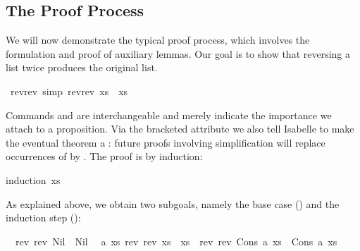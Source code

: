 \begin{isabellebody}
\begin{isamarkuptext}
\subsection{The Proof Process}

We will now demonstrate the typical proof process, which involves
the formulation and proof of auxiliary lemmas.
Our goal is to show that reversing a list twice produces the original
list.%
\end{isamarkuptext}%
\isamarkuptrue%
\isamarkupfalse%
\ rev{}rev\ {}simp{}{}\ {}rev{}rev\ xs{}\ {}\ xs{}%
\isadelimproof
%
\endisadelimproof
%
\isatagproof
%
\begin{isamarkuptxt}%
Commands  and  are
interchangeable and merely indicate the importance we attach to a
proposition. Via the bracketed attribute  we also tell Isabelle
to make the eventual theorem a : future proofs
involving simplification will replace occurrences of  by
. The proof is by induction:%
\end{isamarkuptxt}%
\isamarkuptrue%
\isamarkupfalse%
{}induction\ xs{}%
\begin{isamarkuptxt}%
As explained above, we obtain two subgoals, namely the base case () and the induction step ():
\begin{isabelle}%
\ {}{}\ rev\ {}rev\ Nil{}\ {}\ Nil\isanewline
\ {}{}\ {}a\ xs{}\ rev\ {}rev\ xs{}\ {}\ xs\ {}\ rev\ {}rev\ {}Cons\ a\ xs{}{}\ {}\ Cons\ a\ xs%

\end{isabelle}
\end{isamarkuptxt}
\end{isabellebody}
